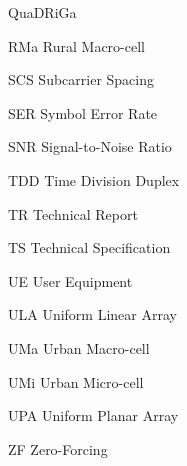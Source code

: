 \documentclass[ecp,tc,english]{iiufrgs}
\begin{document}
\begin{listofabbrv}{QuaDRiGa}
    \item[RMa] Rural Macro-cell
    \item[SCS] Subcarrier Spacing
    \item[SER] Symbol Error Rate
    \item[SNR] Signal-to-Noise Ratio
    \item[TDD] Time Division Duplex
    \item[TR] Technical Report
    \item[TS] Technical Specification
    \item[UE] User Equipment
    \item[ULA] Uniform Linear Array
    \item[UMa] Urban Macro-cell
    \item[UMi] Urban Micro-cell
    \item[UPA] Uniform Planar Array
    \item[ZF] Zero-Forcing
\end{listofabbrv}


\tableofcontents




% 
\end{document}
